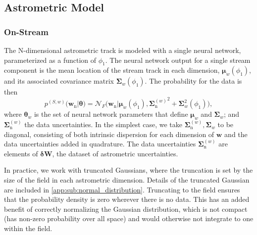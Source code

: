 \documentclass[twocolumn]{aastex631}
\newcommand{\mrm}[1]{\mathrm{#1}}
\newcommand{\mbs}[1]{\boldsymbol{#1}}
\newcommand{\mbf}[1]{\mathbf{#1}}
\newcommand{\mcal}[1]{\mathcal{#1}}
\newcommand{\pdf}{p}
\newcommand{\nth}[1]{{#1}_{\mrm{n}}}  %
\newcommand{\smallcomponent}[2]{#2^{\scriptscriptstyle (#1)}}
\newcommand{\cmp}[2]{\smallcomponent{#1}{#2}}
\newcommand{\astroM}[1]{{#1}_w}
\begin{document}
    
        
    \subsection{Astrometric Model} \label{sub:method:astrometric_model}

        \subsubsection{On-Stream} \label{ssub:method:astrometric_model:on_stream}
    
            The N-dimensional astrometric track is modeled with a single neural
            network, parameterized as a function of $\phi_1$.  The neural
            network output for a single stream component is the mean location of
            the stream track in each dimension, $\astroM{\mbs{\mu}}(\phi_1)$,
            and its associated covariance matrix
            $\astroM{\mbs{\Sigma}}(\phi_1)$. The probability for the data is
            then
            \begin{equation}
                \cmp{S,w}{\pdf}(\nth{\mbs{w}} | \mbs{\theta})
                \!= \mcal{N}_F \big(\nth{\mbs{w}} | \astroM{\mbs{\mu}}\!(\phi_1), {\cmp{w}{\nth{\mbs{\Sigma}}}}^2 \! + \!  \astroM{\mbs{\Sigma}}^2\!\left(\phi_1\right) \!\big),
            \end{equation}
            where $\astroM{\mbs{\theta}}$ is the set of neural network
            parameters that define $\astroM{\mbs{\mu}}$ and
            $\astroM{\mbs{\Sigma}}$; and $\cmp{w}{\nth{\mbs{\Sigma}}}$ the data
            uncertainties.  In the simplest case, we take
            $\cmp{w}{\nth{\mbs{\Sigma}}}, \astroM{\mbs{\Sigma}}$ to be diagonal,
            consisting of both intrinsic dispersion for each dimension of
            $\mbs{w}$ and the data uncertainties added in quadrature. The data
            uncertainties $\cmp{w}{\nth{\mbs{\Sigma}}}$ are elements of
            $\mbs{\delta}\mbf{W}$, the dataset of astrometric uncertainties.

            In practice, we work with truncated Gaussians, where the truncation
            is set by the size of the field in each astrometric dimension.
            Details of the truncated Gaussian are included in
            \autoref{app:sub:normal_distribution}. Truncating to the field
            ensures that the probability density is zero wherever there is no
            data. This has an added benefit of correctly normalizing the
            Gaussian distribution, which is not compact (has non-zero
            probability over all space) and would otherwise not integrate to one
            within the field.
\end{document}
